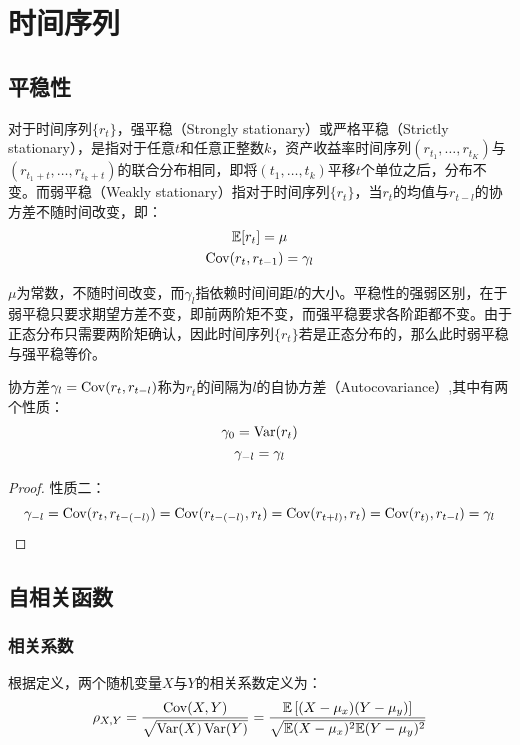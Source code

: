 \documentclass[11pt]{article}
\begin{document}
\section{时间序列}

\subsection{平稳性}

对于时间序列$\{r_t\}$，强平稳（Strongly stationary）或严格平稳（Strictly stationary），是指对于任意$t$和任意正整数$k$，资产收益率时间序列$(r_{t_1},\dots,r_{t_K})$与$(r_{t_1+t},\dots,r_{t_k+t})$的联合分布相同，即将$(t_1,\dots,t_k)$平移$t$个单位之后，分布不变。而弱平稳（Weakly stationary）指对于时间序列$\{r_t\}$，当$r_t$的均值与$r_{t-l}$的协方差不随时间改变，即：
\begin{gather*}
    \mathbb{E} [r_t] = \mu \\
    \operatorname{Cov} (r_t, r_{t-1}) = \gamma_l
\end{gather*}

$\mu$为常数，不随时间改变，而$\gamma_l$指依赖时间间距$l$的大小。平稳性的强弱区别，在于弱平稳只要求期望方差不变，即前两阶矩不变，而强平稳要求各阶距都不变。由于正态分布只需要两阶矩确认，因此时间序列$\{r_t\}$若是正态分布的，那么此时弱平稳与强平稳等价。

协方差$\gamma_l = \operatorname{Cov}(r_t,r_{t-l})$称为$r_t$的间隔为$l$的自协方差（Autocovariance）,其中有两个性质：
\begin{gather*}
    \gamma_0 = \operatorname{Var}(r_t) \\
    \gamma_{-l} = \gamma_{l}
\end{gather*}

\begin{proof}
    性质二：
    \begin{equation*}
        \gamma_{-l} = \operatorname{Cov}(r_{t},r_{t-(-l)}) = \operatorname{Cov}(r_{t-(-l)},r_{t}) 
        = \operatorname{Cov}(r_{t+l)},r_{t}) = \operatorname{Cov}(r_{t)},r_{t-l}) = \gamma_{l}
    \end{equation*}
\end{proof}

\subsection{自相关函数}

\subsubsection{相关系数}

根据定义，两个随机变量$X$与$Y$的相关系数定义为：
\begin{equation*}
    \rho_{X,Y} = \frac{\operatorname{Cov}(X,Y)}{\sqrt{\operatorname{Var}(X)\operatorname{Var}(Y)}}
    = \frac{\mathbb{E}\left[(X-\mu_x)(Y-\mu_y)\right]}{\sqrt{\mathbb{E}(X-\mu_x)^2 \mathbb{E}(Y-\mu_y)^2}}
\end{equation*}
\end{document}
